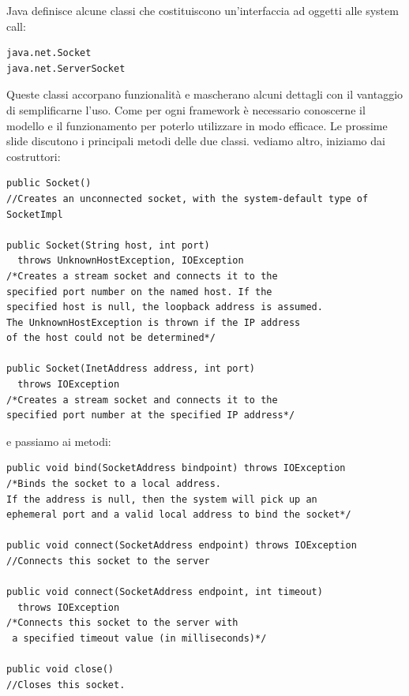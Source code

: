 \documentclass[a4paper,12pt, oneside]{book}
\begin{document}
Java definisce alcune classi che costituiscono un'interfaccia ad oggetti alle system call:
\begin{verbatim}
java.net.Socket
java.net.ServerSocket
\end{verbatim}
Queste classi accorpano funzionalità e mascherano alcuni
dettagli con il vantaggio di semplificarne l'uso.
Come per ogni framework è necessario conoscerne il modello
e il funzionamento per poterlo utilizzare in modo efficace.
Le prossime slide discutono i principali metodi delle due classi. vediamo altro, iniziamo dai costruttori:
\begin{verbatim}
public Socket()
//Creates an unconnected socket, with the system-default type of SocketImpl

public Socket(String host, int port)
  throws UnknownHostException, IOException
/*Creates a stream socket and connects it to the 
specified port number on the named host. If the
specified host is null, the loopback address is assumed.
The UnknownHostException is thrown if the IP address 
of the host could not be determined*/

public Socket(InetAddress address, int port)
  throws IOException
/*Creates a stream socket and connects it to the 
specified port number at the specified IP address*/
\end{verbatim}
e passiamo ai metodi:
\begin{verbatim}
public void bind(SocketAddress bindpoint) throws IOException
/*Binds the socket to a local address.
If the address is null, then the system will pick up an
ephemeral port and a valid local address to bind the socket*/

public void connect(SocketAddress endpoint) throws IOException
//Connects this socket to the server

public void connect(SocketAddress endpoint, int timeout)
  throws IOException
/*Connects this socket to the server with
 a specified timeout value (in milliseconds)*/

public void close()
//Closes this socket.
\end{verbatim}
\end{document}
